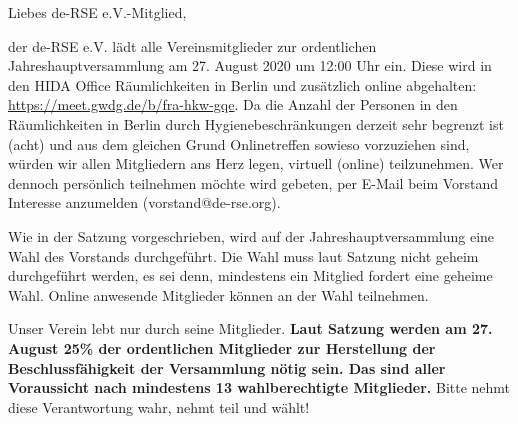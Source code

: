 \documentclass[../Vorlagen/de-RSE_Brief,a4paper]{scrlttr2}
\begin{document}

\begin{letter}{\mbox{}
}
\opening{Liebes de-RSE e.V.-Mitglied,}

der de-RSE e.V. lädt alle Vereinsmitglieder zur ordentlichen Jahreshauptversammlung am 27. August 2020 um 12:00 Uhr ein.
Diese wird in den HIDA Office Räumlichkeiten in Berlin und zusätzlich online abgehalten: \href{https://meet.gwdg.de/b/fra-hkw-gqe}{https://meet.gwdg.de/b/fra-hkw-gqe}.
Da die Anzahl der Personen in den Räumlichkeiten in Berlin durch Hygienebeschränkungen derzeit sehr begrenzt ist (acht) und aus dem gleichen Grund Onlinetreffen sowieso vorzuziehen sind, würden wir allen Mitgliedern ans Herz legen, virtuell (online) teilzunehmen.
Wer dennoch persönlich teilnehmen möchte wird gebeten, per E-Mail beim Vorstand Interesse anzumelden (vorstand@de-rse.org).

Wie in der Satzung vorgeschrieben, wird auf der Jahreshauptversammlung eine Wahl des Vorstands durchgeführt.
Die Wahl muss laut Satzung nicht geheim durchgeführt werden, es sei denn, mindestens ein Mitglied fordert eine geheime Wahl.
Online anwesende Mitglieder können an der Wahl teilnehmen.

Unser Verein lebt nur durch seine Mitglieder.
\textbf{Laut Satzung werden am 27. August 25\% der ordentlichen Mitglieder zur Herstellung der Beschlussfähigkeit der Versammlung nötig sein. Das sind aller Voraussicht nach mindestens 13 wahlberechtigte Mitglieder.}
Bitte nehmt diese Verantwortung wahr, nehmt teil und wählt!


\end{letter}
\end{document}
